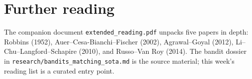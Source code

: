 \documentclass[11pt,oneside]{scrbook}
\begin{document}
\chapter{Further reading}

The companion document \texttt{extended\_reading.pdf} unpacks five papers in
depth: Robbins (1952), Auer--Cesa-Bianchi--Fischer (2002), Agrawal--Goyal
(2012), Li--Chu--Langford--Schapire (2010), and Russo--Van Roy (2014). The
bandit dossier in \texttt{research/bandits\_matching\_sota.md} is the source
material; this week's reading list is a curated entry point.
\end{document}
